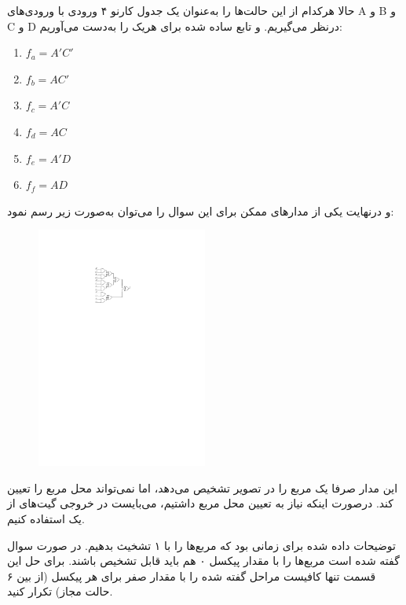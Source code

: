 حالا هرکدام از این حالت‌ها را به‌عنوان یک جدول کارنو ۴ ورودی با ورودی‌های A و B و C و D درنظر می‌گیریم. و تابع ساده شده برای هریک را به‌دست می‌آوریم:


\begin{latin}
	\begin{enumerate}
		\item 
		$f_a=A'C'$
		
		\item 
		$f_b=AC'$
		
		\item 
		$f_c=A'C$
		
		\item 
		$f_d=AC$
		
		\item 
		$f_e=A'D$
		
		\item 
		$f_f=AD$
	\end{enumerate}
\end{latin}

و درنهایت یکی از مدار‌های ممکن برای این سوال را می‌توان به‌صورت زیر رسم نمود:

\begin{figure}[h]
	\centering
	\includegraphics[width=0.5\textwidth]{fig/Q_bunos_circ.pdf}
	\label{img1_bunus}
\end{figure}


این مدار صرفا یک مربع را در تصویر تشخیص می‌دهد، اما نمی‌تواند محل مربع را تعیین کند. درصورت اینکه نیاز به تعیین محل مربع داشتیم، می‌بایست در خروجی گیت‌های  از یک  استفاده کنیم.

توضیحات داده شده برای زمانی بود که مربع‌ها را با ۱ تشخیث بدهیم. در صورت سوال گفته شده است مربع‌ها را با مقدار پیکسل ۰ هم باید قابل تشخیص باشند. برای حل این قسمت تنها کافیست مراحل گفته شده را با مقدار صفر برای هر پیکسل (از بین ۶ حالت مجاز) تکرار کنید.


